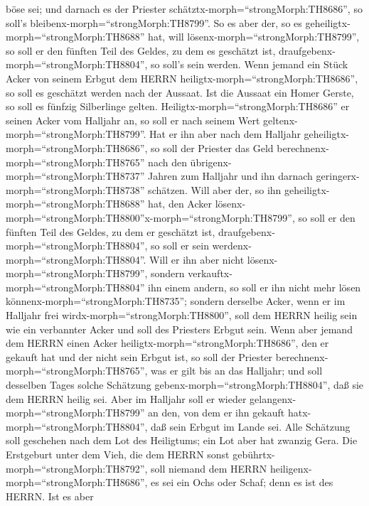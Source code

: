 böse sei; und darnach es der Priester
schätztx-morph=``strongMorph:TH8686'', so soll's
bleibenx-morph=``strongMorph:TH8799''.  So es aber der, so
es geheiligtx-morph=``strongMorph:TH8688'' hat, will
lösenx-morph=``strongMorph:TH8799'', so soll er den fünften Teil des
Geldes, zu dem es geschätzt ist,
draufgebenx-morph=``strongMorph:TH8804'', so soll's sein werden.
 Wenn jemand ein Stück Acker von seinem Erbgut dem HERRN
heiligtx-morph=``strongMorph:TH8686'', so soll es geschätzt werden nach
der Aussaat. Ist die Aussaat ein Homer Gerste, so soll es fünfzig
Silberlinge gelten.  Heiligtx-morph=``strongMorph:TH8686''
er seinen Acker vom Halljahr an, so soll er nach seinem Wert
geltenx-morph=``strongMorph:TH8799''.  Hat er ihn aber nach
dem Halljahr geheiligtx-morph=``strongMorph:TH8686'', so soll der
Priester das Geld berechnenx-morph=``strongMorph:TH8765'' nach den
übrigenx-morph=``strongMorph:TH8737'' Jahren zum Halljahr und ihn
darnach geringerx-morph=``strongMorph:TH8738'' schätzen. 
Will aber der, so ihn geheiligtx-morph=``strongMorph:TH8688'' hat, den
Acker lösenx-morph=``strongMorph:TH8800''x-morph=``strongMorph:TH8799'',
so soll er den fünften Teil des Geldes, zu dem er geschätzt ist,
draufgebenx-morph=``strongMorph:TH8804'', so soll er sein
werdenx-morph=``strongMorph:TH8804''.  Will er ihn aber
nicht lösenx-morph=``strongMorph:TH8799'', sondern
verkauftx-morph=``strongMorph:TH8804'' ihn einem andern, so soll er ihn
nicht mehr lösen könnenx-morph=``strongMorph:TH8735''; 
sondern derselbe Acker, wenn er im Halljahr frei
wirdx-morph=``strongMorph:TH8800'', soll dem HERRN heilig sein wie ein
verbannter Acker und soll des Priesters Erbgut sein.  Wenn
aber jemand dem HERRN einen Acker heiligtx-morph=``strongMorph:TH8686'',
den er gekauft hat und der nicht sein Erbgut ist,  so soll
der Priester berechnenx-morph=``strongMorph:TH8765'', was er gilt bis an
das Halljahr; und soll desselben Tages solche Schätzung
gebenx-morph=``strongMorph:TH8804'', daß sie dem HERRN heilig sei.
 Aber im Halljahr soll er wieder
gelangenx-morph=``strongMorph:TH8799'' an den, von dem er ihn gekauft
hatx-morph=``strongMorph:TH8804'', daß sein Erbgut im Lande sei.
 Alle Schätzung soll geschehen nach dem Lot des Heiligtums;
ein Lot aber hat zwanzig Gera.  Die Erstgeburt unter dem
Vieh, die dem HERRN sonst gebührtx-morph=``strongMorph:TH8792'', soll
niemand dem HERRN heiligenx-morph=``strongMorph:TH8686'', es sei ein
Ochs oder Schaf; denn es ist des HERRN.  Ist es aber
